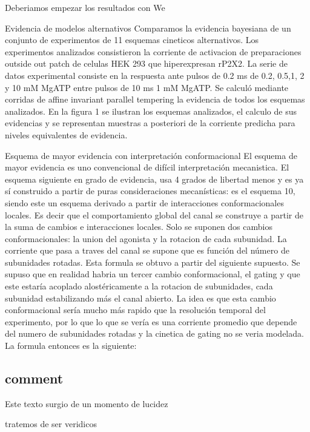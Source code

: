 \documentclass[a4paper,12pt]{article}
\begin{document}
		Deberiamos empezar los resultados con We
		
		Evidencia de modelos alternativos
		Comparamos la evidencia bayesiana de un conjunto de experimentos de 11 esquemas cineticos alternativos. Los experimentos analizados consistieron la corriente de activacion de preparaciones outside out patch de celulas HEK 293 que hiperexpresan rP2X2. La serie de datos experimental consiste en la respuesta ante pulsos de 0.2 ms  de 0.2, 0.5,1, 2 y 10 mM MgATP entre pulsos de 10 ms 1 mM MgATP.  Se calculó mediante corridas de affine invariant parallel tempering la evidencia de todos los esquemas analizados. En la figura 1 se ilustran los esquemas analizados, el calculo de sus evidencias y se representan muestras a posteriori de la corriente predicha para niveles equivalentes de evidencia. 
		
		
		
		Esquema de mayor evidencia con interpretación conformacional
		El esquema de mayor evidencia es uno convencional de difícil interpretación mecanistica. El esquema siguiente en grado de evidencia, usa 4 grados de libertad menos y es ya sí construido a partir de puras consideraciones mecanísticas: es el esquema 10, siendo este un esquema derivado a partir de interacciones conformacionales locales. Es decir que el comportamiento global del canal se construye a partir de la suma de cambios e interacciones locales. Solo se suponen dos cambios conformacionales: la union del agonista y la rotacion de cada subunidad. La corriente que pasa a traves del canal se supone que es función del número de subunidades rotadas. Esta formula se obtuvo a partir del siguiente supuesto. Se supuso que en realidad habria un tercer cambio conformacional, el gating y que este estaría acoplado alostéricamente a la rotacion de subunidades, cada subunidad estabilizando más el canal abierto. 
		La idea es que esta cambio conformacional sería mucho más rapido que la resolución temporal del experimento, por lo que lo que se vería es una corriente promedio que depende del numero de subunidades rotadas y la cinetica de gating no se veria modelada. La formula entonces es la siguiente: 
	
	
	\subsection{comment}
		
		Este texto surgio de un momento de lucidez
		
		
		tratemos de ser veridicos
		
\end{document}
